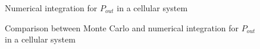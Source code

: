 \documentclass[10pt]{article}
\begin{document}
\begin{figure}[h!]
  \centering
  \caption{Numerical integration for $P_{out}$ in a cellular system}
  \label{fig:cell_GQR}
\end{figure}

\begin{figure}[H]
  \centering
  \caption{Comparison between Monte Carlo and numerical integration for $P_{out}$ in a cellular system}
  \label{fig:cell_both}
\end{figure}
\end{document}
